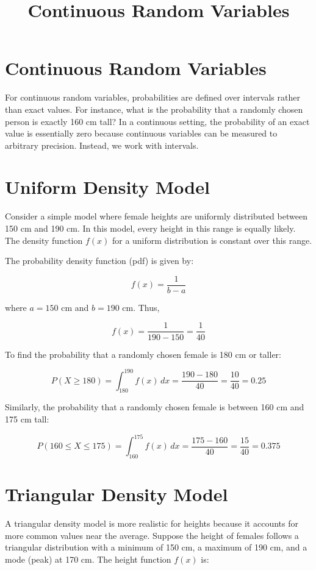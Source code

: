 \documentclass{article}
\title{Continuous Random Variables}
\author{}
\date{}
\begin{document}
\maketitle

\section{Continuous Random Variables}
For continuous random variables, probabilities are defined over intervals rather than exact values. For instance, what is the probability that a randomly chosen person is exactly 160 cm tall? In a continuous setting, the probability of an exact value is essentially zero because continuous variables can be measured to arbitrary precision. Instead, we work with intervals.

\section{Uniform Density Model}
Consider a simple model where female heights are uniformly distributed between 150 cm and 190 cm. In this model, every height in this range is equally likely. The density function \( f(x) \) for a uniform distribution is constant over this range.

The probability density function (pdf) is given by:

\[
f(x) = \frac{1}{b - a}
\]

where \( a = 150 \) cm and \( b = 190 \) cm. Thus,

\[
f(x) = \frac{1}{190 - 150} = \frac{1}{40}
\]

To find the probability that a randomly chosen female is 180 cm or taller:

\[
P(X \geq 180) = \int_{180}^{190} f(x) \, dx = \frac{190 - 180}{40} = \frac{10}{40} = 0.25
\]

Similarly, the probability that a randomly chosen female is between 160 cm and 175 cm tall:

\[
P(160 \leq X \leq 175) = \int_{160}^{175} f(x) \, dx = \frac{175 - 160}{40} = \frac{15}{40} = 0.375
\]

\section{Triangular Density Model}
A triangular density model is more realistic for heights because it accounts for more common values near the average. Suppose the height of females follows a triangular distribution with a minimum of 150 cm, a maximum of 190 cm, and a mode (peak) at 170 cm. The height function \( f(x) \) is:
\end{document}
